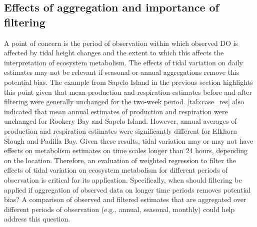 \documentclass[letterpaper,12pt,oneside]{article}\usepackage[]{graphicx}\usepackage[]{color}
\begin{document}
\subsection{Effects of aggregation and importance of filtering}

A point of concern is the period of observation within which observed \ac{DO} is affected by tidal height changes and the extent to which this affects the interpretation of ecosystem metabolism.  The effects of tidal variation on daily estimates may not be relevant if seasonal or annual aggregations remove this potential bias.  The example from Sapelo Island in the previous section highlights this point given that mean production and respiration estimates before and after filtering were generally unchanged for the two-week period. \cref{tab:case_res} also indicated that mean annual estimates of production and respiration were unchanged for Rookery Bay and Sapelo Island.  However, annual averages of production and respiration estimates were significantly different for Elkhorn Slough and Padilla Bay. Given these results, tidal variation may or may not have effects on metabolism estimates on time scales longer than 24 hours, depending on the location.  Therefore, an evaluation of weighted regression to filter the effects of tidal variation on ecosystem metabolism for different periods of observation is critical for its application.  Specifically, when should filtering be applied if aggregation of observed data on longer time periods removes potential bias?  A comparison of observed and filtered estimates that are aggregated over different periods of observation (e.g., annual, seasonal, monthly) could help address this question.
\end{document}

